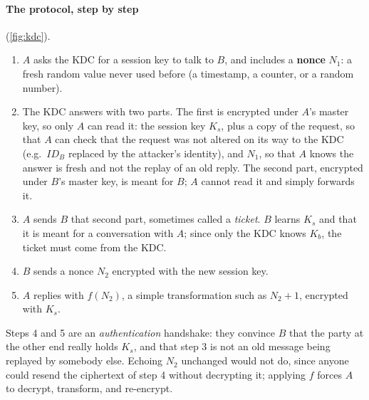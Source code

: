 \paragraph{The protocol, step by step} (\cref{fig:kdc}).
\begin{enumerate}
    \item $A$ asks the KDC for a session key to talk to $B$, and includes a \textbf{nonce} $N_1$: a fresh random value never used before (a timestamp, a counter, or a random number).
    \item The KDC answers with two parts. The first is encrypted under $A$'s master key, so only $A$ can read it: the session key $K_s$, plus a copy of the request, so that $A$ can check that the request was not altered on its way to the KDC (e.g.\ $ID_B$ replaced by the attacker's identity), and $N_1$, so that $A$ knows the answer is fresh and not the replay of an old reply. The second part, encrypted under $B$'s master key, is meant for $B$; $A$ cannot read it and simply forwards it.
    \item $A$ sends $B$ that second part, sometimes called a \emph{ticket}. $B$ learns $K_s$ and that it is meant for a conversation with $A$; since only the KDC knows $K_b$, the ticket must come from the KDC.
    \item $B$ sends a nonce $N_2$ encrypted with the new session key.
    \item $A$ replies with $f(N_2)$, a simple transformation such as $N_2 + 1$, encrypted with $K_s$.
\end{enumerate}
Steps 4 and 5 are an \emph{authentication} handshake: they convince $B$ that the party at the other end really holds $K_s$, and that step 3 is not an old message being replayed by somebody else. Echoing $N_2$ unchanged would not do, since anyone could resend the ciphertext of step 4 without decrypting it; applying $f$ forces $A$ to decrypt, transform, and re-encrypt.

